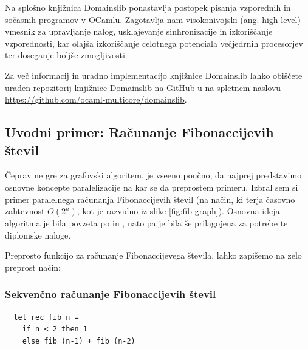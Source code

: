 \documentclass[mat1, tisk]{fmfdelo}
\begin{document}
Na splošno knjižnica Domainslib ponastavlja postopek pisanja vzporednih in sočasnih programov v OCamlu. 
Zagotavlja nam visokonivojski (ang. high-level) vmesnik za upravljanje nalog, usklajevanje sinhronizacije in
izkoriščanje vzporednosti, kar olajša izkoriščanje celotnega potenciala večjedrnih procesorjev ter doseganje boljše
zmogljivosti.

Za več informacij in uradno implementacijo knjižnice Domainslib lahko obiščete uraden repozitorij
knjižnice Domainslib na GitHub-u na spletnem naslovu \url{https://github.com/ocaml-multicore/domainslib}.


\subsection{Uvodni primer: Računanje Fibonaccijevih števil}

Čeprav ne gre za grafovski algoritem, je vseeno poučno, da najprej predstavimo osnovne koncepte
paralelizacije na kar se da preprostem primeru. Izbral sem si primer paralelnega računanja Fibonaccijevih števil
(na način, ki terja časovno zahtevnost $O(2^n)$, kot je razvidno iz slike \ref{fig:fib-graph}).
Osnovna ideja algoritma je bila povzeta po \cite{parallel_fib_computation} in \cite{multicore_ocaml_article},
nato pa je bila še prilagojena za potrebe te diplomske naloge. 

Preprosto funkcijo za računanje Fibonaccijevega števila, lahko zapišemo na zelo preprost način:

\subsubsection{Sekvenčno računanje Fibonaccijevih števil}

\begin{lstlisting}
  let rec fib n =
    if n < 2 then 1
    else fib (n-1) + fib (n-2)
\end{lstlisting}
\end{document}
